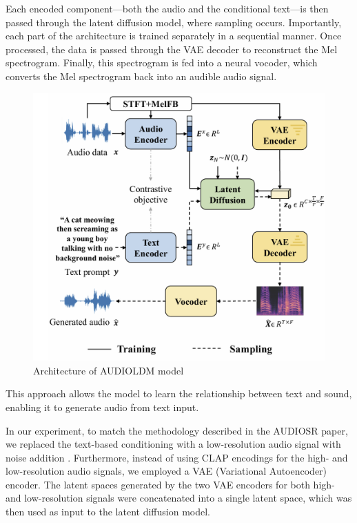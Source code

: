 \documentclass[
  ]{scrartcl}
\begin{document}
Each encoded component---both the audio and the conditional text---is
then passed through the latent diffusion model, where sampling occurs.
Importantly, each part of the architecture is trained separately in a
sequential manner. Once processed, the data is passed through the VAE
decoder to reconstruct the Mel spectrogram. Finally, this spectrogram is
fed into a neural vocoder, which converts the Mel spectrogram back into
an audible audio signal.

\begin{figure}
\centering
\includegraphics{images/audioldm_architecture_original.png}
\caption{Architecture of AUDIOLDM model}
\end{figure}

This approach allows the model to learn the relationship between text
and sound, enabling it to generate audio from text input.

In our experiment, to match the methodology described in the AUDIOSR
paper, we replaced the text-based conditioning with a low-resolution
audio signal with noise addition . Furthermore, instead of using CLAP
encodings for the high- and low-resolution audio signals, we employed a
VAE (Variational Autoencoder) encoder. The latent spaces generated by
the two VAE encoders for both high- and low-resolution signals were
concatenated into a single latent space, which was then used as input to
the latent diffusion model.
\end{document}
